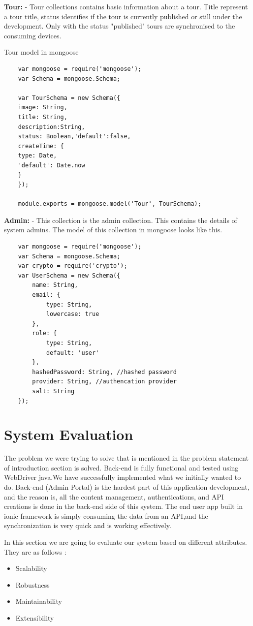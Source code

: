 		\textbf	{Tour:} - Tour collections contains basic information about a tour.  Title represent a tour title, status identifies if  the tour is currently published or still under the development. Only with the status "published" tours are synchronised to the consuming devices. 
		
		Tour model in mongoose
		\begin{verbatim}
	var mongoose = require('mongoose');
	var Schema = mongoose.Schema;
	
	var TourSchema = new Schema({
	image: String,
	title: String,
	description:String,
	status: Boolean,'default':false,
	createTime: {
	type: Date,
	'default': Date.now
	}
	});
	
	module.exports = mongoose.model('Tour', TourSchema);
	\end{verbatim}
	
		
		\textbf{Admin:} - This collection is the admin collection. This contains the details of system admins. The model of this collection in mongoose looks like this. 
		
	\begin{verbatim}
	var mongoose = require('mongoose');
	var Schema = mongoose.Schema;
	var crypto = require('crypto');
	var UserSchema = new Schema({
		name: String,  
		email: {
			type: String,
			lowercase: true
		},
		role: {
			type: String,
			default: 'user'
		},
		hashedPassword: String, //hashed password
		provider: String, //authencation provider
		salt: String
	});
	\end{verbatim}
		

\chapter{System Evaluation}

	The problem we were trying to solve that is mentioned in the problem statement of introduction section is solved. Back-end is fully functional and tested using WebDriver java.We have successfully implemented what we initially wanted to do. Back-end (Admin Portal) is the hardest part of this application development, and the reason is, all the content management, authentications, and API creations is done in the back-end side of this system. The end user app built in ionic framework  is simply consuming the data from an API,and the synchronization is very quick and is working effectively. 
	
	In this section we are going to evaluate our system based on different attributes. They are as follows : 
	\begin{itemize}
	\item	Scalability
	\item	Robustness
	\item	Maintainability
	\item	Extensibility 
	\end{itemize}
	
